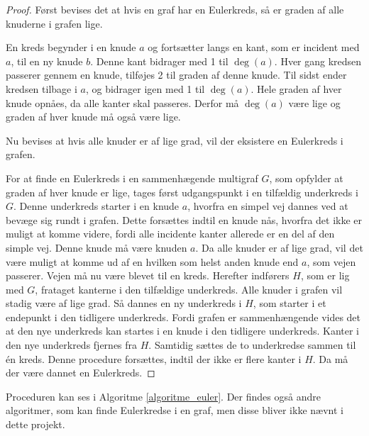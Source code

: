 \begin{proof} 
	Først bevises det at hvis en graf har en Eulerkreds, så er graden af alle knuderne i grafen lige. 

	En kreds begynder i en knude $a$ og fortsætter langs en kant, som er incident med $a$, til en ny knude $b$. 
	Denne kant bidrager med 1 til $\deg(a)$. 
	Hver gang kredsen passerer gennem en knude, tilføjes 2 til graden af denne knude. 
	Til sidst ender kredsen tilbage i $a$, og bidrager igen med 1 til $\deg(a)$.
	Hele graden af hver knude opnåes, da alle kanter skal passeres.  
	Derfor må $\deg(a)$ være lige og graden af hver knude må også være lige.  
	
	Nu bevises at hvis alle knuder er af lige grad, vil der eksistere en Eulerkreds i grafen.

	For at finde en Eulerkreds i en sammenhægende multigraf  $G$, som opfylder at graden af hver knude er lige, tages først udgangspunkt i en tilfældig underkreds i $G$.
	Denne underkreds starter i en knude $a$, hvorfra en simpel vej dannes ved at bevæge sig rundt i grafen. 
	Dette forsættes indtil en knude nås, hvorfra det ikke er muligt at komme videre, fordi alle incidente kanter allerede er en del af den simple vej.
	Denne knude må være knuden $a$. 
	Da alle knuder er af lige grad, vil det være muligt at komme ud af en hvilken som helst anden knude end $a$, som vejen passerer. 
	Vejen må nu være blevet til en kreds.  
	Herefter indførers $H$, som er lig med $G$, frataget kanterne i den tilfældige underkreds.
	Alle knuder i grafen vil stadig være af lige grad.
	Så dannes en ny underkreds i $H$, som starter i et endepunkt i den tidligere underkreds.
	Fordi grafen er sammenhængende vides det at den nye underkreds kan startes i en knude i den tidligere underkreds. 
	Kanter i den nye underkreds fjernes fra $H$. 
	Samtidig sættes de to underkredse sammen til én kreds.
	Denne procedure forsættes, indtil der ikke er flere kanter i $H$.
	Da må der være dannet en Eulerkreds. 
\end{proof} 
 
Proceduren kan ses i Algoritme \ref{algoritme_euler}.
Der findes også andre algoritmer, som kan finde Eulerkredse i en graf, men disse bliver ikke nævnt i dette projekt.
  
